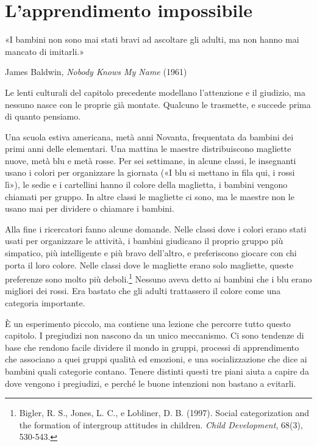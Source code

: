 \chapter{L'apprendimento impossibile}
\label{cap:p2c12}

\epigraph{«I bambini non sono mai stati bravi ad ascoltare gli adulti, ma non hanno mai mancato di imitarli.»}{James Baldwin, \textit{Nobody Knows My Name} (1961)}

Le lenti culturali del capitolo precedente modellano l'attenzione e il giudizio, ma nessuno nasce con le proprie già montate. Qualcuno le trasmette, e succede prima di quanto pensiamo.

Una scuola estiva americana, metà anni Novanta, frequentata da bambini dei primi anni delle elementari. Una mattina le maestre distribuiscono magliette nuove, metà blu e metà rosse. Per sei settimane, in alcune classi, le insegnanti usano i colori per organizzare la giornata («I blu si mettano in fila qui, i rossi lì»), le sedie e i cartellini hanno il colore della maglietta, i bambini vengono chiamati per gruppo. In altre classi le magliette ci sono, ma le maestre non le usano mai per dividere o chiamare i bambini.

Alla fine i ricercatori fanno alcune domande. Nelle classi dove i colori erano stati usati per organizzare le attività, i bambini giudicano il proprio gruppo più simpatico, più intelligente e più bravo dell'altro, e preferiscono giocare con chi porta il loro colore. Nelle classi dove le magliette erano solo magliette, queste preferenze sono molto più deboli.\footnote{Bigler, R. S., Jones, L. C., e Lobliner, D. B. (1997). Social categorization and the formation of intergroup attitudes in children. \textit{Child Development}, 68(3), 530-543.} Nessuno aveva detto ai bambini che i blu erano migliori dei rossi. Era bastato che gli adulti trattassero il colore come una categoria importante.

È un esperimento piccolo, ma contiene una lezione che percorre tutto questo capitolo. I pregiudizi non nascono da un unico meccanismo. Ci sono tendenze di base che rendono facile dividere il mondo in gruppi, processi di apprendimento che associano a quei gruppi qualità ed emozioni, e una socializzazione che dice ai bambini quali categorie contano. Tenere distinti questi tre piani aiuta a capire da dove vengono i pregiudizi, e perché le buone intenzioni non bastano a evitarli.



